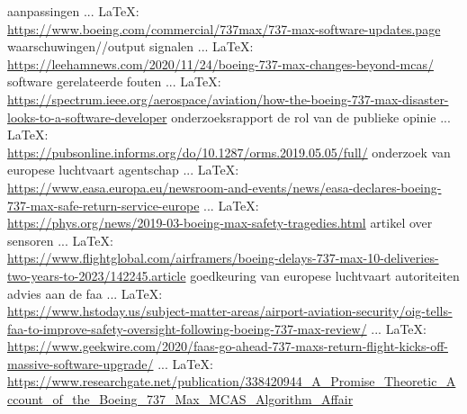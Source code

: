 {{\cite{thomas30082020737safest}
aanpassingen
 ... \LaTeX:\\ \url{https://www.boeing.com/commercial/737max/737-max-software-updates.page}
\cite{boeing737maxdisplay}
waarschuwingen//output signalen
 ... \LaTeX:\\ \url{https://leehamnews.com/2020/11/24/boeing-737-max-changes-beyond-mcas/}
\cite{fehrm24112020737changes}
software gerelateerde fouten
 ... \LaTeX:\\ \url{https://spectrum.ieee.org/aerospace/aviation/how-the-boeing-737-max-disaster-looks-to-a-software-developer}
\cite{travis18042019737maxsoftwaredevop}
onderzoeksrapport
de rol van de publieke opinie
 ... \LaTeX:\\ \url{https://pubsonline.informs.org/do/10.1287/orms.2019.05.05/full/}
\cite{barnett05052019737maxcrisis}
onderzoek van europese luchtvaart agentschap
 ... \LaTeX:\\ \url{https://www.easa.europa.eu/newsroom-and-events/news/easa-declares-boeing-737-max-safe-return-service-europe}
\cite{easa27012021737maxsafereturn}
\veiligheidsvraagstuk
{} ... \LaTeX:\\ \url{https://phys.org/news/2019-03-boeing-max-safety-tragedies.html}
\cite{touitou11032019737tragedies}
artikel over sensoren
 ... \LaTeX:\\ \url{https://www.flightglobal.com/airframers/boeing-delays-737-max-10-deliveries-two-years-to-2023/142245.article}
\cite{hemmerdinger02022021737maxdeliveries}
goedkeuring van europese luchtvaart autoriteiten
advies aan de faa
 ... \LaTeX:\\ \url{https://www.hstoday.us/subject-matter-areas/airport-aviation-security/oig-tells-faa-to-improve-safety-oversight-following-boeing-737-max-review/}
\cite{bielby27022021faaimprovesafety}
 ... \LaTeX:\\ \url{https://www.geekwire.com/2020/faas-go-ahead-737-maxs-return-flight-kicks-off-massive-software-upgrade/}
\cite{boyle18112020737maxupgrade}
 ... \LaTeX:\\ \url{https://www.researchgate.net/publication/338420944_A_Promise_Theoretic_Account_of_the_Boeing_737_Max_MCAS_Algorithm_Affair}
\cite{bergstraburgess122019737maxMcasAlgorithm}
}}
